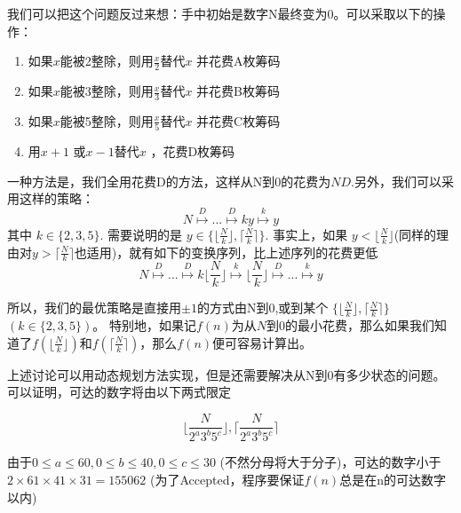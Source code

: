 我们可以把这个问题反过来想：手中初始是数字N最终变为0。可以采取以下的操作：

\begin{enumerate}
    \item 如果\( x \)能被2整除，则用\(\frac{x}{2} \)替代\(x\) 并花费A枚筹码
    \item 如果\( x \)能被3整除，则用\(\frac{x}{3} \)替代\(x\) 并花费B枚筹码
    \item 如果\( x \)能被5整除，则用\(\frac{x}{5} \)替代\(x\) 并花费C枚筹码
    \item 用\(x+1\) 或\(x-1\)替代\(x\) ，花费D枚筹码 
\end{enumerate}

一种方法是，我们全用花费D的方法，这样从N到0的花费为\(ND\).另外，我们可以采用这样的策略：
\[ N \stackrel{D}{\longmapsto}...\stackrel{D}{\longmapsto}ky \stackrel{k}{\longmapsto} y\]
其中 \( k \in \{2,3,5\}\).
需要说明的是 
\( y \in \{ \lfloor \frac{N}{k} \rfloor, \lceil \frac{N}{k} \rceil\}\).
事实上，如果 \(y<\lfloor \frac{N}{k} \rfloor\)(同样的理由对\(y>\lceil \frac{N}{k} \rceil \)也适用)，就有如下的变换序列，比上述序列的花费更低
\[ N \stackrel{D}{\longmapsto}...\stackrel{D}{\longmapsto} k\lfloor \frac{N}{k} \rfloor \stackrel{k}{\longmapsto}  \lfloor \frac{N}{k} \rfloor \stackrel{D}{\longmapsto}... \stackrel{k}{\longmapsto} y\]

所以，我们的最优策略是直接用\(\pm1\)的方式由N到0,或到某个
\( \{ \lfloor \frac{N}{k} \rfloor, \lceil \frac{N}{k} \rceil\}\)
\((k \in \{2,3,5\})\)。
特别地，如果记\( f(n) \)为从\(N\)到0的最小花费，那么如果我们知道了\(f( \lfloor \frac{N}{k} \rfloor)\)和\( f( \lceil \frac{N}{k} \rceil)\)，那么\(f(n)\)便可容易计算出。

上述讨论可以用动态规划方法实现，但是还需要解决从N到0有多少状态的问题。可以证明，可达的数字将由以下两式限定

\[ \lfloor \frac{N}{2^a3^b5^c} \rfloor , \lceil \frac{N}{2^a3^b5^c} \rceil \]

由于\( 0 \leq a \leq 60, 0 \leq b \leq 40 , 0 \leq c \leq 30 \)
(不然分母将大于分子)，可达的数字小于\(2\times 61 \times 41 \times 31= 155062\)
(为了Accepted，程序要保证\(f(n)\)总是在n的可达数字以内)




